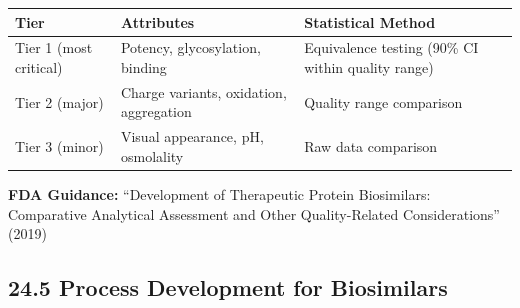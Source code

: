 \documentclass[
  11pt,
  a4paper,
]{report}
\begin{document}
\begin{longtable}[]{@{}lll@{}}
\toprule
\begin{minipage}[b]{0.15\columnwidth}\raggedright
Tier\strut
\end{minipage} & \begin{minipage}[b]{0.28\columnwidth}\raggedright
Attributes\strut
\end{minipage} & \begin{minipage}[b]{0.48\columnwidth}\raggedright
Statistical Method\strut
\end{minipage}\tabularnewline
\midrule
\endhead
\begin{minipage}[t]{0.15\columnwidth}\raggedright
Tier 1 (most critical)\strut
\end{minipage} & \begin{minipage}[t]{0.28\columnwidth}\raggedright
Potency, glycosylation, binding\strut
\end{minipage} & \begin{minipage}[t]{0.48\columnwidth}\raggedright
Equivalence testing (90\% CI within quality range)\strut
\end{minipage}\tabularnewline
\begin{minipage}[t]{0.15\columnwidth}\raggedright
Tier 2 (major)\strut
\end{minipage} & \begin{minipage}[t]{0.28\columnwidth}\raggedright
Charge variants, oxidation, aggregation\strut
\end{minipage} & \begin{minipage}[t]{0.48\columnwidth}\raggedright
Quality range comparison\strut
\end{minipage}\tabularnewline
\begin{minipage}[t]{0.15\columnwidth}\raggedright
Tier 3 (minor)\strut
\end{minipage} & \begin{minipage}[t]{0.28\columnwidth}\raggedright
Visual appearance, pH, osmolality\strut
\end{minipage} & \begin{minipage}[t]{0.48\columnwidth}\raggedright
Raw data comparison\strut
\end{minipage}\tabularnewline
\bottomrule
\end{longtable}

\textbf{FDA Guidance:} ``Development of Therapeutic Protein Biosimilars:
Comparative Analytical Assessment and Other Quality-Related
Considerations'' (2019)

\hypertarget{process-development-for-biosimilars}{%
\subsection{24.5 Process Development for
Biosimilars}\label{process-development-for-biosimilars}}
\end{document}
